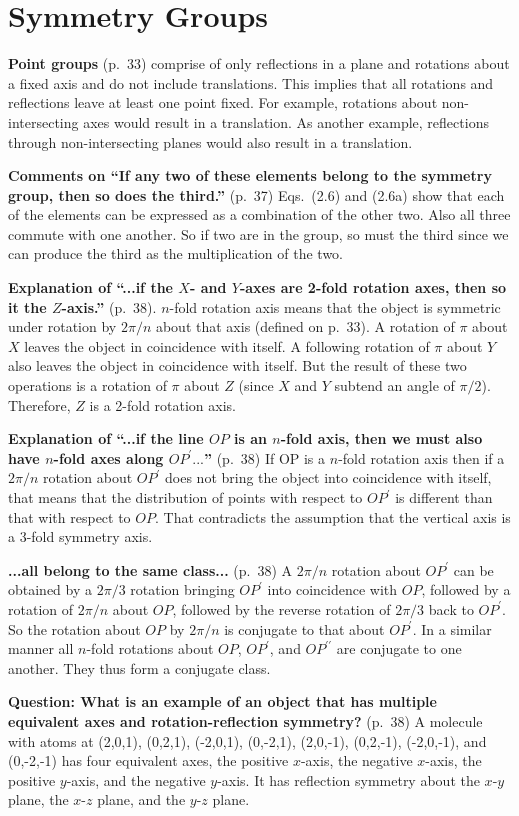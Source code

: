 \chapter{Symmetry Groups}

{\bf Point groups} (p.\ 33) comprise of only reflections in a plane and
rotations about a fixed axis and do not include translations. This
implies that all rotations and reflections leave at least one point
fixed. For example, rotations about non-intersecting axes would result
in a translation. As another example, reflections through
non-intersecting planes would also result in a translation.

{\bf Comments on ``If any two of these elements belong to the symmetry
  group, then so does the third.''} (p.\ 37) Eqs.\ (2.6) and (2.6a)
show that each of the elements can be expressed as a combination of
the other two. Also all three commute with one another. So if two are
in the group, so must the third since we can produce the third as the
multiplication of the two.

{\bf Explanation of ``...if the $X$- and $Y$-axes are 2-fold rotation
  axes, then so it the $Z$-axis.''} (p.\ 38). $n$-fold rotation axis
means that the object is symmetric under rotation by $2\pi/n$ about
that axis (defined on p.\ 33).  A rotation of $\pi$ about $X$ leaves
the object in coincidence with itself. A following rotation of $\pi$
about $Y$ also leaves the object in coincidence with itself. But the
result of these two operations is a rotation of $\pi$ about $Z$ (since
$X$ and $Y$ subtend an angle of $\pi/2$). Therefore, $Z$ is a 2-fold
rotation axis.

{\bf Explanation of ``...if the line $OP$ is an $n$-fold axis, then we
  must also have $n$-fold axes along $OP^\prime...$''} (p.\ 38) If OP
is a $n$-fold rotation axis then if a $2\pi/n$ rotation about $OP^\prime$
does not bring the object into coincidence with itself, that means
that the distribution of points with respect to $OP^\prime$ is
different than that with respect to $OP$. That contradicts the
assumption that the vertical axis is a 3-fold symmetry axis.

{\bf ...all belong to the same class...} (p.\ 38) A $2\pi/n$ rotation about
$OP^\prime$ can be obtained by a $2\pi/3$ rotation bringing $OP^\prime$ into
coincidence with $OP$, followed by a rotation of $2\pi/n$ about $OP$,
followed by the reverse rotation of $2\pi/3$ back to $OP^\prime$. So the
rotation about $OP$ by $2\pi/n$ is conjugate to that about $OP^\prime$. In a
similar manner all $n$-fold rotations about $OP$, $OP^\prime$, and
$OP^{\prime\prime}$ are conjugate to one another. They thus form a
conjugate class.

{\bf Question: What is an example of an object that has multiple equivalent axes and rotation-reflection symmetry?} (p.\ 38)
A molecule with atoms at (2,0,1), (0,2,1), (-2,0,1), (0,-2,1), (2,0,-1), (0,2,-1), (-2,0,-1), and (0,-2,-1) has four equivalent axes, the positive $x$-axis, the negative $x$-axis, the positive $y$-axis, and the negative $y$-axis. It has reflection symmetry about the $x$-$y$ plane, the $x$-$z$ plane, and the $y$-$z$ plane.
